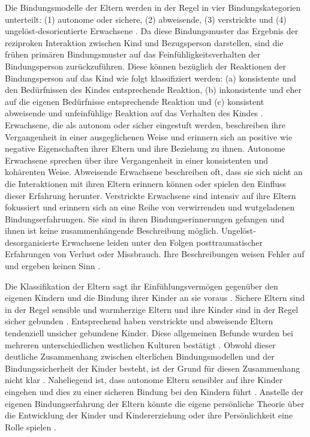 Die Bindungsmodelle der Eltern werden in der Regel in vier Bindungskategorien unterteilt: (1) autonome oder sichere, (2) abweisende, (3) verstrickte und (4) ungelöst-desorientierte Erwachsene \cite[S.~593 ff.]{Siegler2008}. Da diese Bindungsmuster das Ergebnis der reziproken Interaktion zwischen Kind und Bezugsperson darstellen, sind die frühen primären Bindungsmuster auf das Feinfühligkeitsverhalten der Bindungsperson zurückzuführen. Diese können bezüglich der Reaktionen der Bindungsperson auf das Kind wie folgt klassifiziert werden: (a) konsistente und den Bedürfnissen des Kindes entsprechende Reaktion, (b) inkonsistente und eher auf die eigenen Bedürfnisse entsprechende Reaktion und (c) konsistent abweisende und unfeinfühlige Reaktion auf das Verhalten des Kindes \cite{Schmidt2004}. 
Erwachsene, die als autonom oder sicher eingestuft werden, beschreiben ihre Vergangenheit in einer ausgeglichenen Weise und erinnern sich an positive wie negative Eigenschaften ihrer Eltern und ihre Beziehung zu ihnen. Autonome Erwachsene sprechen über ihre Vergangenheit in einer konsistenten und kohärenten Weise. Abweisende Erwachsene beschreiben oft, dass sie sich nicht an die Interaktionen mit ihren Eltern erinnern können oder spielen den Einfluss dieser Erfahrung herunter. Verstrickte Erwachsene sind intensiv auf ihre Eltern fokussiert und erinnern sich an eine Reihe von verwirrenden und wutgeladenen Bindungserfahrungen. Sie sind in ihren Bindungserinnerungen gefangen und ihnen ist keine zusammenhängende Beschreibung möglich. Ungelöst-desorganisierte Erwachsene leiden unter den Folgen posttraumatischer Erfahrungen von Verlust oder Missbrauch. Ihre Beschreibungen weisen Fehler auf und ergeben keinen Sinn \cite{Schmidt2004}.

Die Klassifikation der Eltern sagt ihr Einfühlungsvermögen gegenüber den eigenen Kindern und die Bindung ihrer Kinder an sie voraus \cite{Siegler2008}. Sichere Eltern sind in der Regel sensible und warmherzige Eltern und ihre Kinder sind in der Regel sicher gebunden \nohyphens{\cite{Magai2000, Steele1996}}. Entsprechend haben verstrickte und abweisende Eltern tendenziell unsicher gebundene Kinder. Diese allgemeinen Befunde wurden bei mehreren unterschiedlichen westlichen Kulturen bestätigt \cite{Hesse1999}. Obwohl dieser deutliche Zusammenhang zwischen elterlichen Bindungsmodellen und der Bindungssicherheit der Kinder besteht, ist der Grund für diesen Zusammenhang nicht klar \cite{Siegler2008}. Naheliegend ist, dass autonome Eltern sensibler auf ihre Kinder eingehen und dies zu einer sicheren Bindung bei den Kindern führt \cite{Pederson1998}. Anstelle der eigenen Bindungserfahrung der Eltern könnte die eigene persönliche Theorie über die Entwicklung der Kinder und Kindererziehung oder ihre Persönlichkeit  eine Rolle spielen \cite{Thompson1998}.

